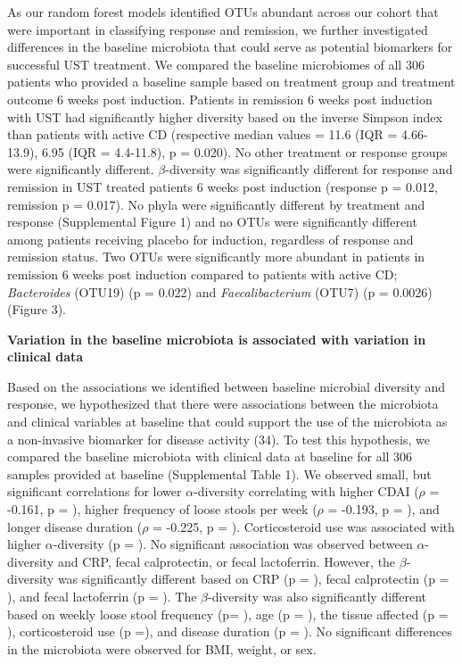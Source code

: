 \documentclass[11pt,]{article}
\begin{document}
As our random forest models identified OTUs abundant across our cohort
that were important in classifying response and remission, we further
investigated differences in the baseline microbiota that could serve as
potential biomarkers for successful UST treatment. We compared the
baseline microbiomes of all 306 patients who provided a baseline sample
based on treatment group and treatment outcome 6 weeks post induction.
Patients in remission 6 weeks post induction with UST had significantly
higher diversity based on the inverse Simpson index than patients with
active CD (respective median values = 11.6 (IQR = 4.66-13.9), 6.95 (IQR
= 4.4-11.8), p = 0.020). No other treatment or response groups were
significantly different. \({\beta}\)-diversity was significantly
different for response and remission in UST treated patients 6 weeks
post induction (response p = 0.012, remission p = 0.017). No phyla were
significantly different by treatment and response (Supplemental Figure
1) and no OTUs were significantly different among patients receiving
placebo for induction, regardless of response and remission status. Two
OTUs were significantly more abundant in patients in remission 6 weeks
post induction compared to patients with active CD; \emph{Bacteroides}
(OTU19) (p = 0.022) and \emph{Faecalibacterium} (OTU7) (p = 0.0026)
(Figure 3).

\textbf{Variation in the baseline microbiota is associated with
variation in clinical data}

Based on the associations we identified between baseline microbial
diversity and response, we hypothesized that there were associations
between the microbiota and clinical variables at baseline that could
support the use of the microbiota as a non-invasive biomarker for
disease activity (34). To test this hypothesis, we compared the baseline
microbiota with clinical data at baseline for all 306 samples provided
at baseline (Supplemental Table 1). We observed small, but significant
correlations for lower \({\alpha}\)-diversity correlating with higher
CDAI (\({\rho}\) = -0.161, p = ), higher frequency of loose stools per
week (\({\rho}\) = -0.193, p = ), and longer disease duration
(\({\rho}\) = -0.225, p = ). Corticosteroid use was associated with
higher \({\alpha}\)-diversity (p = ). No significant association was
observed between \({\alpha}\)-diversity and CRP, fecal calprotectin, or
fecal lactoferrin. However, the \({\beta}\)-diversity was significantly
different based on CRP (p = ), fecal calprotectin (p = ), and fecal
lactoferrin (p = ). The \({\beta}\)-diversity was also significantly
different based on weekly loose stool frequency (p= ), age (p = ), the
tissue affected (p = ), corticosteroid use (p =), and disease duration
(p = ). No significant differences in the microbiota were observed for
BMI, weight, or sex.
\end{document}
